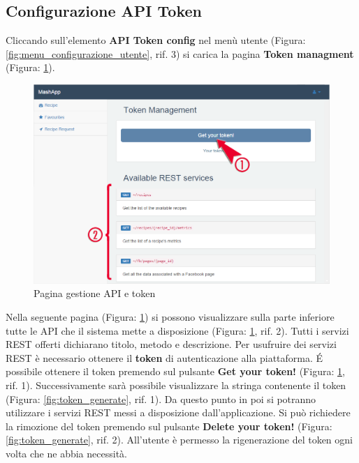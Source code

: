 	\pagebreak
	\subsection{Configurazione API Token} %
	\label{sec:settings_utente}
		Cliccando sull'elemento \textbf{API Token config} nel menù utente (Figura: \ref{fig:menu_configurazione_utente}, rif. 3) si carica la pagina \textbf{Token\gloss{} managment} (Figura: \ref{fig:token_config}).
		\begin{figure}[H]
			\centering
			\centerline{\includegraphics[width=14cm]{images/token_config.png}}
			\caption{Pagina gestione API e token}
			\label{fig:token_config}
		\end{figure}
		\noindent
		Nella seguente pagina (Figura: \ref{fig:token_config}) si possono visualizzare sulla parte inferiore tutte le API\gloss{} che il sistema mette a disposizione (Figura: \ref{fig:token_config}, rif. 2). Tutti i servizi REST\gloss{} offerti dichiarano titolo, metodo e descrizione.\newline
		Per usufruire dei servizi REST\gloss{} è necessario ottenere il \textbf{token}\gloss{} di autenticazione\gloss{} alla piattaforma.\newline 
		É possibile ottenere il token\gloss{} premendo sul pulsante \textbf{Get your token!} (Figura: \ref{fig:token_config}, rif. 1).\newline
		Successivamente sarà possibile visualizzare la stringa contenente il token\gloss{} (Figura: \ref{fig:token_generate}, rif. 1). Da questo punto in poi si potranno utilizzare i servizi REST\gloss{} messi a disposizione dall'applicazione.
		Si può richiedere la rimozione del token premendo sul pulsante \textbf{Delete your token!} (Figura: \ref{fig:token_generate}, rif. 2). All'utente è permesso la rigenerazione del token ogni volta che ne abbia necessità.

